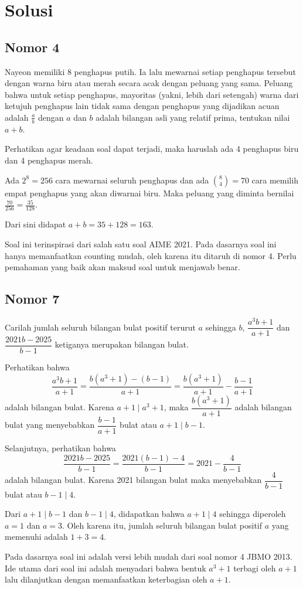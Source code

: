 \documentclass[12pt]{scrartcl}
\begin{document}
\section{Solusi}
\subsection{Nomor 4}
Nayeon memiliki 8 penghapus putih. Ia lalu mewarnai setiap penghapus tersebut dengan warna biru atau merah secara acak dengan peluang yang sama. Peluang bahwa untuk setiap penghapus, mayoritas (yakni, lebih dari setengah) warna dari ketujuh penghapus lain tidak sama dengan penghapus yang dijadikan acuan adalah $\frac{a}{b}$ dengan $a$ dan $b$ adalah bilangan asli yang relatif prima, tentukan nilai $a+b$.
\begin{jawaban}
Perhatikan agar keadaan soal dapat terjadi, maka haruslah ada 4 penghapus biru dan 4 penghapus merah.

Ada $2^{8} = 256$ cara mewarnai seluruh penghapus dan ada ${8 \choose 4} = 70$ cara memilih empat penghapus yang akan diwarnai biru. Maka peluang yang diminta bernilai $\frac{70}{256}=\frac{35}{128}$.

Dari sini didapat $a+b = 35+128 = \boxed{163}$.
\end{jawaban}
\begin{remark}
Soal ini terinspirasi dari salah satu soal AIME 2021. Pada dasarnya soal ini hanya memanfaatkan counting mudah, oleh karena itu ditaruh di nomor 4. Perlu pemahaman yang baik akan maksud soal untuk menjawab benar.
\end{remark}

\newpage 
\subsection{Nomor 7}  Carilah jumlah seluruh bilangan bulat positif terurut $a$ sehingga $b$, $\dfrac{a^3b+1}{a+1}$ dan $\dfrac{2021b-2025}{b-1}$ ketiganya merupakan bilangan bulat.

\begin{jawaban}
Perhatikan bahwa $$\dfrac{a^3b+1}{a+1}=\dfrac{b(a^3+1)-(b-1)}{a+1} =\dfrac{b(a^3+1)}{a+1}-\dfrac{b-1}{a+1}$$ adalah bilangan bulat. Karena $a+1 \mid a^3+1$, maka $\dfrac{b(a^3+1)}{a+1}$ adalah bilangan bulat yang menyebabkan $\dfrac{b-1}{a+1}$ bulat atau $a+1 \mid b-1$.
			
			Selanjutnya, perhatikan bahwa $$\dfrac{2021b-2025}{b-1}=\dfrac{2021(b-1)-4}{b-1}=2021-\dfrac{4}{b-1}$$ adalah bilangan bulat. Karena 2021 bilangan bulat maka menyebabkan $\dfrac{4}{b-1}$ bulat atau $b-1 \mid 4$. 
			
			Dari $a+1 \mid b-1$ dan $b-1 \mid 4$, didapatkan bahwa $a+1 \mid 4$ sehingga diperoleh $a=1$ dan $a=3$. Oleh karena itu, jumlah seluruh bilangan bulat positif $a$ yang memenuhi adalah $1+3=\boxed{4}$.
\end{jawaban}
\begin{remark}
Pada dasarnya soal ini adalah versi lebih mudah dari soal nomor 4 JBMO 2013. Ide utama dari soal ini adalah menyadari bahwa bentuk $a^3+1$ terbagi oleh $a+1$ lalu dilanjutkan dengan memanfaatkan keterbagian oleh $a+1$.
\end{remark}
\end{document}

